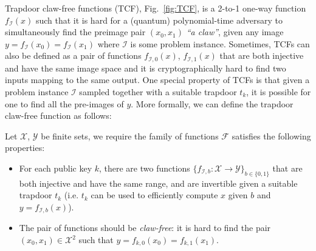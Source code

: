 Trapdoor claw-free functions (TCF), Fig.~\ref{fig:TCF}, is a 2-to-1 one-way function $f_\mathcal{I}(x)$ such that it is hard for a (quantum) polynomial-time adversary to simultaneously find the preimage pair $(x_0,x_1)$ \textit{``a claw''}, given any image $y = f_{\mathcal{I}}(x_0)=f_{\mathcal{I}}(x_1)$ where $\mathcal{I}$ is some problem instance. Sometimes, TCFs can also be defined as a pair of functions $f_{\mathcal{I},0}(x)$, $f_{\mathcal{I},1}(x)$ that are both injective and have the same image space and it is cryptographically hard to find two inputs mapping to the same output. One special property of TCFs is that given a problem instance $\mathcal{I}$ sampled together with a suitable trapdoor $t_{k}$, it is possible for one to find all the pre-images of $y$. More formally, we can define the trapdoor claw-free function as follows:
\begin{defn}
    Let $\mathcal{X}$, $\mathcal{Y}$ be finite sets, we require the family of functions $\mathcal{F}$ satisfies the following properties:
\begin{itemize}
    \item For each public key $k$, there are two functions $\{f_{\mathcal{I},b}:\mathcal{X}\to\mathcal{Y}\}_{b\in\{0,1\}}$ that are both injective and have the same range, and are invertible given a suitable trapdoor $t_k$ (i.e.  $t_k$ can be used to efficiently compute $x$ given $b$ and $y=f_{\mathcal{I},b}(x)$). 
    \item The pair of functions should be \textit{claw-free}: it is hard to find the pair $(x_0,x_1)\in\mathcal{X}^2$ such that $y=f_{k,0}(x_0)=f_{k,1}(x_1)$.
\end{itemize}
\end{defn}

